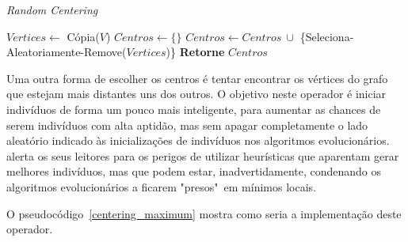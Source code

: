 \begin{algorithm}                  %
	\caption{\textit{Random Centering}}          %
	\label{centering_random}                           %
	\begin{algorithmic}                    %
		\newline
		\State $Vertices \gets $ Cópia($V$)
		\State $Centros \gets \{\}$
			\State $Centros \gets Centros\ \cup$ \{Seleciona-Aleatoriamente-Remove($Vertices$)\}
		\EndFor
		\State \textbf{Retorne} $Centros$
		\EndProcedure
	\end{algorithmic}
\end{algorithm}

Uma outra forma de escolher os centros é tentar encontrar os vértices do grafo 
que estejam mais distantes uns dos outros. O objetivo neste operador é iniciar 
indivíduos de forma um pouco mais inteligente, para aumentar as chances de 
serem indivíduos com alta aptidão, mas sem apagar completamente o lado aleatório 
indicado às inicializações de indivíduos nos algoritmos evolucionários. 
\citep{Luke2013Metaheuristics} alerta os seus leitores para os perigos de 
utilizar heurísticas que aparentam gerar melhores indivíduos, mas que podem 
estar, inadvertidamente, condenando os algoritmos evolucionários a ficarem 
"presos"\ em mínimos locais.

O pseudocódigo~\ref{centering_maximum} mostra como seria a implementação deste 
operador.


